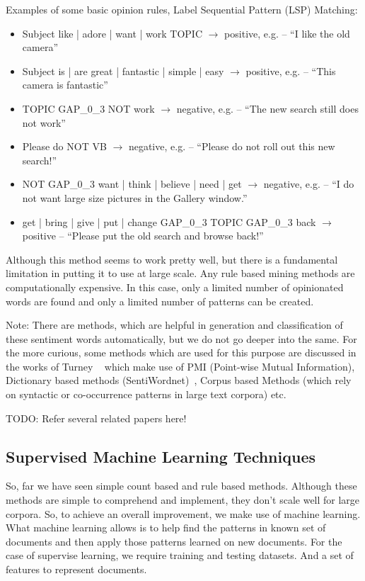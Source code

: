 Examples of some basic opinion rules, Label Sequential Pattern (LSP) Matching:
\begin{itemize}
\item Subject {like | adore | want | work} TOPIC $\rightarrow$ positive, e.g. – ``I like the old camera”
\item Subject {is | are} {great | fantastic | simple | easy} $\rightarrow$ positive, e.g. – ``This camera is fantastic”
\item TOPIC GAP\_0\_3 NOT work $\rightarrow$ negative, e.g. – ``The new search still does not work”
\item Please do NOT VB $\rightarrow$ negative, e.g. – ``Please do not roll out this new search!”
\item NOT GAP\_0\_3 {want | think | believe | need | get} $\rightarrow$ negative, e.g. – ``I do not want large size pictures in the Gallery window.”
\item {get | bring | give | put | change} GAP\_0\_3 TOPIC GAP\_0\_3 back $\rightarrow$ positive
– ``Please put the old search and browse back!”
\end{itemize} 

Although this method seems to work pretty well, but there is a fundamental limitation in putting it to use at large scale. Any rule based mining methods are computationally expensive. In this case, only a limited number of opinionated words are found and only a limited number of patterns can be created. 

Note: There are methods, which are helpful in generation and classification of these sentiment words automatically, but we do not go deeper into the same. For the more curious, some methods which are used for this purpose are discussed in the works of Turney ~\parencite{ch1:turney} which make use of PMI (Point-wise Mutual Information), Dictionary based methods (SentiWordnet)~\parencite{sentiwn}, Corpus based Methods (which rely on syntactic or co-occurrence patterns in large text corpora) etc. 

TODO: Refer several related papers here! 

\subsection{Supervised Machine Learning Techniques}
So, far we have seen simple count based and rule based methods. Although these methods are simple to comprehend and implement,  they don't scale well for large corpora. So, to achieve an overall improvement, we make use of machine learning. What machine learning allows is to help find the patterns in known set of documents and then apply those patterns learned on new documents. For the case of supervise learning, we require training and testing datasets. And a set of features to represent documents. 
\newline

